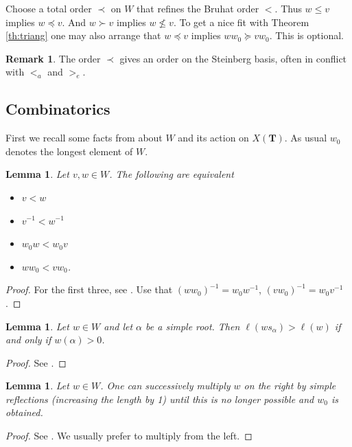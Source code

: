 \documentclass[sn-mathphys-num]{sn-jnl}%
\newcommand{\bt}{\mathbf T}
\newtheorem{lemma}[theorem]{Lemma}
\theoremstyle{definition}
\newtheorem{remark}[theorem]{Remark}
\begin{document}
  Choose a total order $\prec$ on $W$  that refines the Bruhat order $<$.
Thus $w\leq v$ implies $w\preceq v$. And $w\succ v$ implies $w\nleq v$.
To get a nice fit with Theorem \ref{th:triang} one may also arrange that $w\preceq v$ implies $ww_0\succeq vw_0$. This is optional.
\begin{remark}
    The order $\prec$ gives an order on the Steinberg basis, often in conflict with $<_a$ and $>_e$.
\end{remark}
\subsection{Combinatorics}\label{subsec:comb}

 First we recall some facts from \cite{Humphreys} about $W$ and its action on $X( \bt)$. As usual $w_0$
  denotes the longest element of $W$.
\begin{lemma}\label{lew0reverse} Let $v,w\in W$. The following are equivalent
\begin{itemize}
\item $v<w$ \item $v^{-1}<w^{-1}$ \item $w_0w<w_0v$ \item $ww_0<vw_0$.
\end{itemize}
\end{lemma}
\begin{proof}For the first three, see \cite[page 119]{Humphreys}.
Use that $(ww_0)^{-1}=w_0w^{-1}$, $(vw_0)^{-1}=w_0v^{-1}$.
\end{proof}

\begin{lemma}\label{lem:ws shorter} Let $w\in W$ and let $\alpha $ be a simple root.
Then $\ell(ws_\alpha)>\ell(w)$ if and only if $w(\alpha)>0$.
\end{lemma}
\begin{proof}See \cite[page 116]{Humphreys}.
\end{proof}

\begin{lemma}\label{lem:left fill} Let $w\in W$.
One can successively multiply $w$ on the right by simple reflections (increasing the length by 1) until this is no longer possible and $w_0$ is obtained.\end{lemma}

\begin{proof}See \cite[page 16]{Humphreys}. We usually prefer to multiply from the left.
\end{proof}
\end{document}

